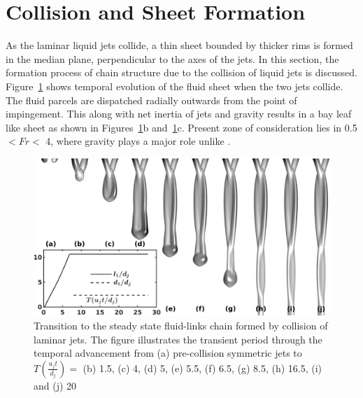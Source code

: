 \documentclass{jfm}
\begin{document}
\section{Collision and Sheet Formation}
As the laminar liquid jets collide, a thin sheet bounded by thicker rims is formed in the median plane, perpendicular to the axes of the jets. In this section, the formation process of chain structure due to the collision of liquid jets is discussed. Figure~\ref{Figure::transient} shows temporal evolution of the fluid sheet when the two jets collide. The fluid parcels are dispatched radially outwards from the point of impingement. This along with net inertia of jets and gravity results in a bay leaf like sheet as shown in Figures~\ref{Figure::transient}b and~\ref{Figure::transient}c. Present zone of consideration lies in 0.5 $< Fr <$ 4, where gravity plays a major role unlike \cite{bush2004collision,bremond2006atomization}.
\begin{figure}
	\centering
	\includegraphics[width=\linewidth]{Figure3}
	\caption{Transition to the steady state fluid-links chain formed by collision of laminar jets. The figure illustrates the transient period through the temporal advancement from (a) pre-collision symmetric jets to $T (\frac{u_jt}{d_j}) = $ (b) 1.5, (c) 4, (d) 5, (e) 5.5, (f) 6.5, (g) 8.5, (h) 16.5, (i) and (j) 20}
	\label{Figure::transient}
\end{figure}
\end{document}
